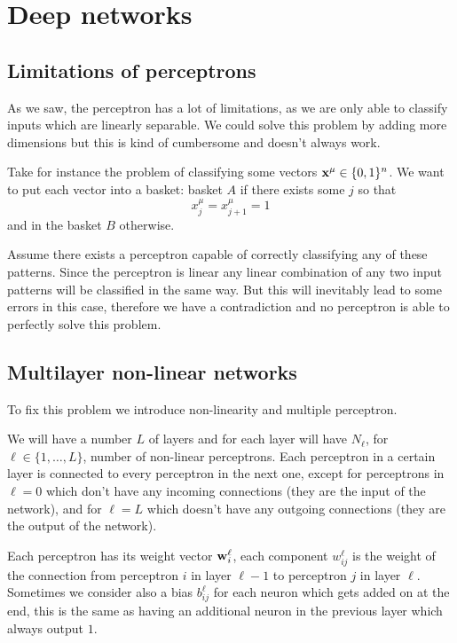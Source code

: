 \documentclass[12pt]{extarticle}
\renewcommand{\vec}[1]{\bvec{#1}}
\begin{document}
\section{Deep networks}

\subsection{Limitations of perceptrons}
As we saw, the perceptron has a lot of limitations, as we are only able to classify inputs which are
linearly separable.
We could solve this problem by adding more dimensions but this is kind of cumbersome and doesn't
always work.

Take for instance the problem of classifying some vectors $\vec x^\mu \in \{0, 1\}^n$.
We want to put each vector into a basket: basket $A$ if there exists some $j$ so that
\begin{equation}
	x^\mu_j = x^\mu_{j+1} = 1
\end{equation}
and in the basket $B$ otherwise.

Assume there exists a perceptron capable of correctly classifying any of these patterns. Since the
perceptron is linear any linear combination of any two input patterns will be classified in the same
way. But this will inevitably lead to some errors in this case, therefore we have a contradiction
and no perceptron is able to perfectly solve this problem.

\subsection{Multilayer non-linear networks}

To fix this problem we introduce non-linearity and multiple perceptron.

We will have a number $L$ of layers and for each layer will have $N_\ell$,
for $\ell \in \{1, \dots, L\}$, number of non-linear perceptrons.
Each perceptron in a certain layer is connected to every perceptron in the next one, except for
perceptrons in $\ell = 0$ which don't have any incoming connections (they are the input of the
network), and for $\ell = L$ which doesn't have any outgoing connections (they are the output of the
network).

Each perceptron has its weight vector $\vec w^\ell_i$, each component $w^\ell_{ij}$ is the weight of
the connection from perceptron $i$ in layer $\ell -1$ to perceptron $j$ in layer $\ell$.
Sometimes we consider also a bias $b^\ell_{ij}$ for each neuron which gets added on at the end, this
is the same as having an additional neuron in the previous layer which always output $1$.
\end{document}
